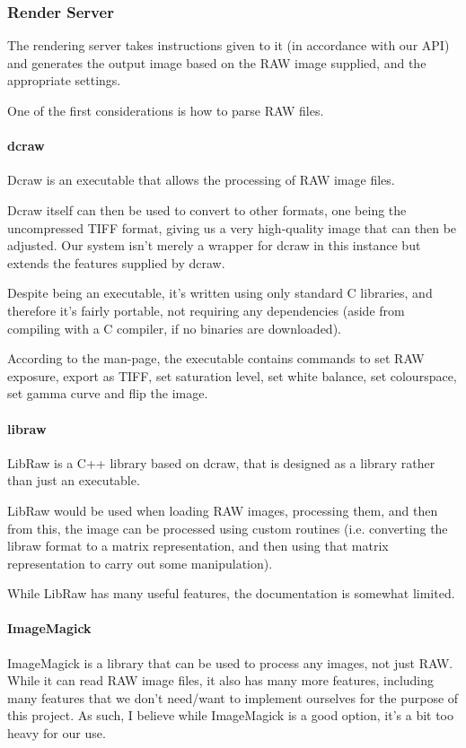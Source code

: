 \documentclass[12pt,a4paper]{article}
\begin{document}
\subsubsection{Render Server}
The rendering server takes instructions given to it (in accordance with our API) and generates the output image based on the RAW image supplied, and the appropriate settings.

One of the first considerations is how to parse RAW files.

\paragraph{dcraw}
Dcraw is an executable that allows the processing of RAW image files.

Dcraw itself can then be used to convert to other formats, one being the uncompressed TIFF format,
giving us a very high-quality image that can then be adjusted. Our system isn't merely a wrapper for
dcraw in this instance but extends the features supplied by dcraw.

Despite being an executable, it's written using only standard C libraries, and therefore it's fairly portable, not requiring any dependencies (aside from compiling with a C compiler, if
no binaries are downloaded). \cite{DcrawWebsite}

According to the man-page, the executable contains commands to set RAW exposure, export as TIFF,
set saturation level, set white balance, set colourspace, set gamma curve and flip the image. \cite{DcrawManpage}


\paragraph{libraw}
LibRaw is a C++ library based on dcraw, that is designed as a library rather than just an executable.

LibRaw would be used when loading RAW images, processing them, and then from this, the image can be processed using custom routines (i.e. converting the libraw format to a matrix representation, and then using that matrix representation to carry out
some manipulation).

While LibRaw has many useful features, the documentation is somewhat limited.

\paragraph{ImageMagick}
ImageMagick is a library that can be used to process any images, not just RAW. While it can read RAW image files, it also has many more features, including many features that we don't need/want to
implement ourselves for the purpose of this project. As such, I believe while ImageMagick is a good option,
it's a bit too heavy for our use.
\end{document}
